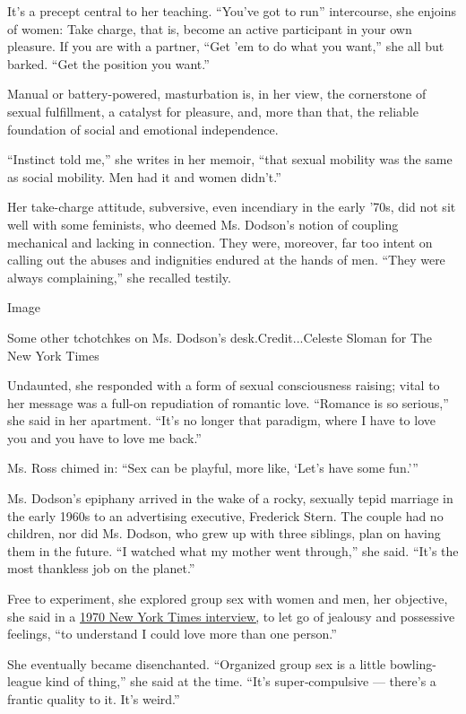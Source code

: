 It's a precept central to her teaching. ``You've got to run''
intercourse, she enjoins of women: Take charge, that is, become an
active participant in your own pleasure. If you are with a partner,
``Get 'em to do what you want,'' she all but barked. ``Get the position
you want.''

Manual or battery-powered, masturbation is, in her view, the cornerstone
of sexual fulfillment, a catalyst for pleasure, and, more than that, the
reliable foundation of social and emotional independence.

``Instinct told me,'' she writes in her memoir, ``that sexual mobility
was the same as social mobility. Men had it and women didn't.''

Her take-charge attitude, subversive, even incendiary in the early '70s,
did not sit well with some feminists, who deemed Ms. Dodson's notion of
coupling mechanical and lacking in connection. They were, moreover, far
too intent on calling out the abuses and indignities endured at the
hands of men. ``They were always complaining,'' she recalled testily.

Image

Some other tchotchkes on Ms. Dodson's desk.Credit...Celeste Sloman for
The New York Times

Undaunted, she responded with a form of sexual consciousness raising;
vital to her message was a full-on repudiation of romantic love.
``Romance is so serious,'' she said in her apartment. ``It's no longer
that paradigm, where I have to love you and you have to love me back.''

Ms. Ross chimed in: ``Sex can be playful, more like, `Let's have some
fun.'''

Ms. Dodson's epiphany arrived in the wake of a rocky, sexually tepid
marriage in the early 1960s to an advertising executive, Frederick
Stern. The couple had no children, nor did Ms. Dodson, who grew up with
three siblings, plan on having them in the future. ``I watched what my
mother went through,'' she said. ``It's the most thankless job on the
planet.''

Free to experiment, she explored group sex with women and men, her
objective, she said in a
\href{https://www.nytimes3xbfgragh.onion/1971/05/10/archives/group-sex-is-it-life-art-or-a-sign-that-something-is-wrong.html}{1970
New York Times interview,} to let go of jealousy and possessive
feelings, ``to understand I could love more than one person.''

She eventually became disenchanted. ``Organized group sex is a little
bowling-league kind of thing,'' she said at the time. ``It's
super‐compulsive --- there's a frantic quality to it. It's weird.''

